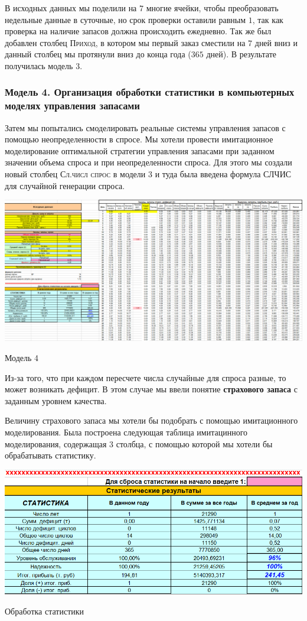 \documentclass[aps,%
12pt,%
final,%
oneside,
onecolumn,%
musixtex, %
superscriptaddress,%
centertags]{article} %
\theoremstyle{plain}
\theoremstyle{definition}
\theoremstyle{remark}
\begin{document}
В исходных данных мы поделили на $7$ многие ячейки, чтобы преобразовать недельные данные в суточные, но срок проверки оставили равным $1$, так как проверка на наличие запасов должна происходить ежедневно. Так же был добавлен столбец \textsc{Приход}, в котором мы первый заказ сместили на $7$ дней вниз и данный столбец мы протянули вниз до конца года ($365$ дней). В результате получилась модель $3$.

\subsubsection{Модель 4. Организация обработки статистики в компьютерных моделях управления запасами}

Затем мы попытались смоделировать реальные системы управления запасов с помощью неопределенности в спросе. Мы хотели провести имитационное моделирование оптимальной стратегии управления запасами при заданном значении объема спроса и при неопределенности спроса. Для этого мы создали новый столбец \textsc{Сл.числ спрос} в модели $3$ и туда была введена формула \textsc{СЛЧИС} для случайной генерации спроса.

\begin{center}
  \includegraphics[scale=0.25]{images/4e.png}

  Модель 4
\end{center}

Из-за того, что при каждом пересчете числа случайные для спроса разные, то может возникать дефицит. В этом случае мы ввели понятие \textbf{страхового запаса} с заданным уровнем качества.

Величину страхового запаса мы хотели бы подобрать с помощью имитационного моделирования. Была построена следующая таблица имитацинного моделирования, содержащая $3$ столбца, с помощью которой мы хотели бы обрабатывать статистику.

\begin{center}
  \includegraphics[scale=0.4]{images/4d.png}

  Обработка статистики
\end{center}
\end{document}
